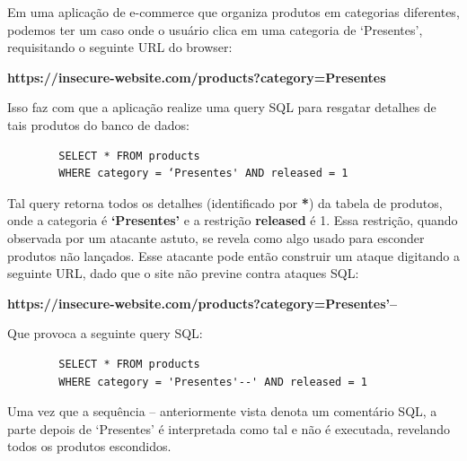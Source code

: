 \begin{alineas}
    \item
    Em uma aplicação de e-commerce que organiza produtos em categorias diferentes, podemos ter um caso onde o usuário clica em uma categoria de ‘Presentes’, requisitando o seguinte URL do browser:
    
    \textbf{https://insecure-website.com/products?category=Presentes}
    
    Isso faz com que a aplicação realize uma query SQL para resgatar detalhes de tais produtos do banco de dados:
    
    \begin{verbatim}
        SELECT * FROM products
        WHERE category = ‘Presentes' AND released = 1 
    \end{verbatim}
    
    Tal query retorna todos os detalhes (identificado por \textbf{*}) da tabela de produtos, onde a categoria é \textbf{‘Presentes’} e a restrição \textbf{released} é 1. Essa restrição, quando observada por um atacante astuto, se revela como algo usado para esconder produtos não lançados. Esse atacante pode então construir um ataque digitando a seguinte URL, dado que o site não previne contra ataques SQL:
        
    \textbf{https://insecure-website.com/products?category=Presentes’--}
    
    Que provoca a seguinte query SQL:
    
    \begin{verbatim}
        SELECT * FROM products 
        WHERE category = 'Presentes'--' AND released = 1 
    \end{verbatim}
    
     Uma vez que a sequência -- anteriormente vista denota um comentário SQL, a parte depois de 
    ‘Presentes’ é interpretada como tal e não é executada, revelando todos os produtos escondidos.

\end{alineas}

